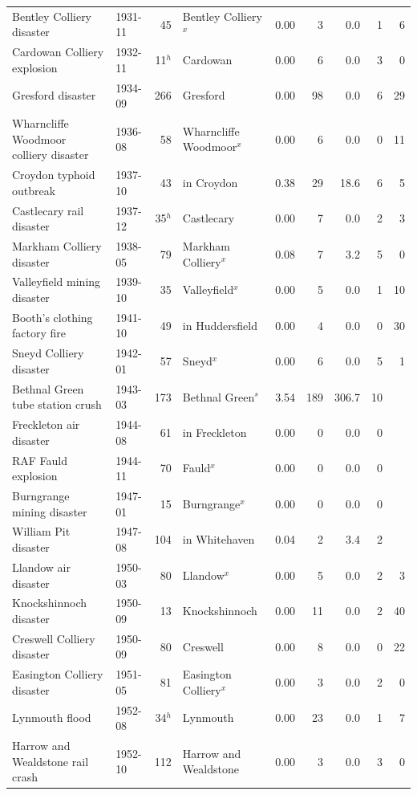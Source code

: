 \documentclass[11pt,a4paper]{article}
\begin{document}
{\begin{longtable}{p{5.2cm}lrlrrrrr}
Bentley Colliery disaster & 1931-11 & 45 & Bentley Colliery$^x$ & 0.00 & 3 & 0.0 & 1 & 6\\
Cardowan Colliery explosion & 1932-11 & 11$^h$ & Cardowan & 0.00 & 6 & 0.0 & 3 & 0\\
Gresford disaster & 1934-09 & 266 & Gresford & 0.00 & 98 & 0.0 & 6 & 29\\
Wharncliffe Woodmoor colliery disaster & 1936-08 & 58 & Wharncliffe Woodmoor$^x$ & 0.00 & 6 & 0.0 & 0 & 11\\
Croydon typhoid outbreak & 1937-10 & 43 & in Croydon & 0.38 & 29 & 18.6 & 6 & 5\\
Castlecary rail disaster & 1937-12 & 35$^h$ & Castlecary & 0.00 & 7 & 0.0 & 2 & 3\\
Markham Colliery disaster & 1938-05 & 79 & Markham Colliery$^x$ & 0.08 & 7 & 3.2 & 5 & 0\\
Valleyfield mining disaster & 1939-10 & 35 & Valleyfield$^x$ & 0.00 & 5 & 0.0 & 1 & 10\\
Booth's clothing factory fire & 1941-10 & 49 & in Huddersfield & 0.00 & 4 & 0.0 & 0 & 30\\
Sneyd Colliery disaster & 1942-01 & 57 & Sneyd$^x$ & 0.00 & 6 & 0.0 & 5 & 1\\
Bethnal Green tube station crush & 1943-03 & 173 & Bethnal Green$^s$ & 3.54 & 189 & 306.7 & 10 & \\
Freckleton air disaster & 1944-08 & 61 & in Freckleton & 0.00 & 0 & 0.0 & 0 & \\
RAF Fauld explosion & 1944-11 & 70 & Fauld$^x$ & 0.00 & 0 & 0.0 & 0 & \\
Burngrange mining disaster & 1947-01 & 15 & Burngrange$^x$ & 0.00 & 0 & 0.0 & 0 & \\
William Pit disaster & 1947-08 & 104 & in Whitehaven & 0.04 & 2 & 3.4 & 2 & \\
Llandow air disaster & 1950-03 & 80 & Llandow$^x$ & 0.00 & 5 & 0.0 & 2 & 3\\
Knockshinnoch disaster & 1950-09 & 13 & Knockshinnoch & 0.00 & 11 & 0.0 & 2 & 40\\
Creswell Colliery disaster & 1950-09 & 80 & Creswell & 0.00 & 8 & 0.0 & 0 & 22\\
Easington Colliery disaster & 1951-05 & 81 & Easington Colliery$^x$ & 0.00 & 3 & 0.0 & 2 & 0\\
Lynmouth flood & 1952-08 & 34$^h$ & Lynmouth & 0.00 & 23 & 0.0 & 1 & 7\\
Harrow and Wealdstone rail crash & 1952-10 & 112 & Harrow and Wealdstone & 0.00 & 3 & 0.0 & 3 & 0\\

\end{longtable}}
\end{document}
